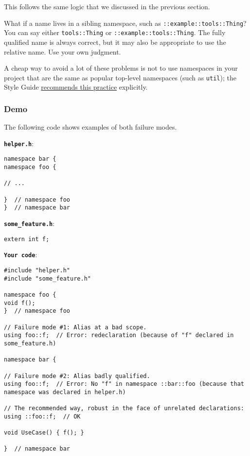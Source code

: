 This follows the same logic that we discussed in the previous section.

What if a name lives in a sibling namespace, such as \texttt{::example::tools::Thing}? You can say either \texttt{tools::Thing} or \texttt{::example::tools::Thing}. The fully qualified name is always correct, but it may also be appropriate to use the relative name. Use your own judgment.

A cheap way to avoid a lot of these problems is not to use namespaces in your project that are the same as popular top-level namespaces (such as \texttt{util}); the Style Guide \hyperref[subsec:namespace-names]{recommends this practice} explicitly.

\subsubsection{Demo}
The following code shows examples of both failure modes.

\textbf{\texttt{helper.h}}:
\begin{verbatim}
namespace bar {
namespace foo {

// ...

}  // namespace foo
}  // namespace bar
\end{verbatim}

\textbf{\texttt{some_feature.h}}:
\begin{verbatim}
extern int f;
\end{verbatim}

\textbf{\texttt{Your code}}:
\begin{verbatim}
#include "helper.h"
#include "some_feature.h"

namespace foo {
void f();
}  // namespace foo

// Failure mode #1: Alias at a bad scope.
using foo::f;  // Error: redeclaration (because of "f" declared in some_feature.h)

namespace bar {

// Failure mode #2: Alias badly qualified.
using foo::f;  // Error: No "f" in namespace ::bar::foo (because that namespace was declared in helper.h)

// The recommended way, robust in the face of unrelated declarations:
using ::foo::f;  // OK

void UseCase() { f(); }

}  // namespace bar
\end{verbatim}

